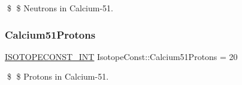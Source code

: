 \$ \$ Neutrons in Calcium-\/51. \mbox{\label{group___isotope_const-_calcium-_ca51_gaf172d213a7a0a01c02d3186d903d487e}} 
\subsubsection{\texorpdfstring{Calcium51\+Protons}{Calcium51Protons}}
{\footnotesize\ttfamily \mbox{\hyperlink{group___isotope_const-_macros_ga5f18360b3e99483a35c32d789e62621c}{I\+S\+O\+T\+O\+P\+E\+C\+O\+N\+S\+T\+\_\+\+I\+NT}} Isotope\+Const\+::\+Calcium51\+Protons = 20}

\$ \$ Protons in Calcium-\/51. 